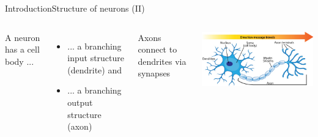 \documentclass[10pt,compress]{beamer} %
\begin{document}
\begin{frame}{Introduction}{Structure of neurons (II)}

    \begin{columns}
		A neuron has a cell body ...
			\begin{itemize}
			\item ... a branching input structure (dendrite) and 
			\item ... a branching output structure (axon)
			\end{itemize}
		Axons connect to dendrites via synapses
		\smallskip
		\begin{center}
			\includegraphics[width=0.6\linewidth]{figs/neuron_anatomy.jpg}
		\end{center}


\end{columns}
\end{frame}
\end{document}
